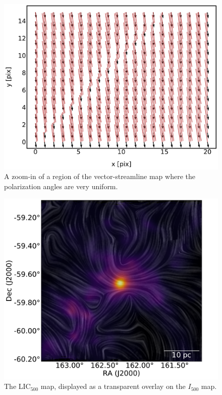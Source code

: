 \begin{figure}[!htbp]
\centering
\includegraphics[width=\textwidth]{figures/carina/vector_sl_zoom}
\caption[~A zoom-in of a region of the vector-streamline map where the polarization angles are very uniform.]{A zoom-in of a region of the vector-streamline map where the polarization angles are very uniform.}
\label{fig:vector_sl_zoom}
\end{figure}

\begin{figure}[!htbp]
\centering
\includegraphics[width=\textwidth]{figures/carina/lic_han_51}
\caption[~The  map, displayed as a transparent overlay on the  map.]{The LIC$_{500}$ map, displayed as a transparent overlay on the $I_{500}$ map.}
\label{fig:lic_han_51}
\end{figure}

